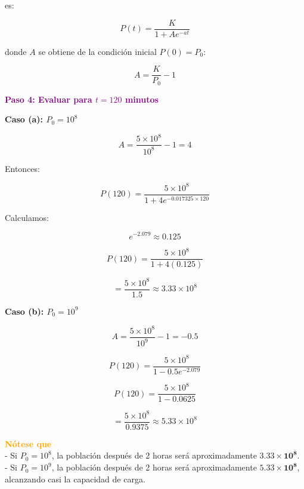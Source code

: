 \documentclass{article}
\begin{document}
es:

\[
P(t) = \frac{K}{1 + A e^{-a t}}
\]

donde \( A \) se obtiene de la condición inicial \( P(0) = P_0 \):

\[
A = \frac{K}{P_0} - 1
\]

\textcolor{purple}{\textbf{Paso 4: Evaluar para \( t = 120 \) minutos}}  

\textbf{Caso (a): \( P_0 = 10^8 \)}  

\[
A = \frac{5 \times 10^8}{10^8} - 1 = 4
\]

Entonces:

\[
P(120) = \frac{5 \times 10^8}{1 + 4 e^{-0.017325 \times 120}}
\]

Calculamos:

\[
e^{-2.079} \approx 0.125
\]

\[
P(120) = \frac{5 \times 10^8}{1 + 4(0.125)}
\]

\[
= \frac{5 \times 10^8}{1.5} \approx 3.33 \times 10^8
\]

\textbf{Caso (b): \( P_0 = 10^9 \)}  

\[
A = \frac{5 \times 10^8}{10^9} - 1 = -0.5
\]

\[
P(120) = \frac{5 \times 10^8}{1 - 0.5 e^{-2.079}}
\]

\[
P(120) = \frac{5 \times 10^8}{1 - 0.0625}
\]

\[
= \frac{5 \times 10^8}{0.9375} \approx 5.33 \times 10^8
\]

\textcolor{orange}{\textbf{Nótese que}}\\  
- Si \( P_0 = 10^8 \), la población después de 2 horas será aproximadamente \( \mathbf{3.33 \times 10^8} \).\\
- Si \( P_0 = 10^9 \), la población después de 2 horas será aproximadamente \( \mathbf{5.33 \times 10^8} \), alcanzando casi la capacidad de carga.
\end{document}
